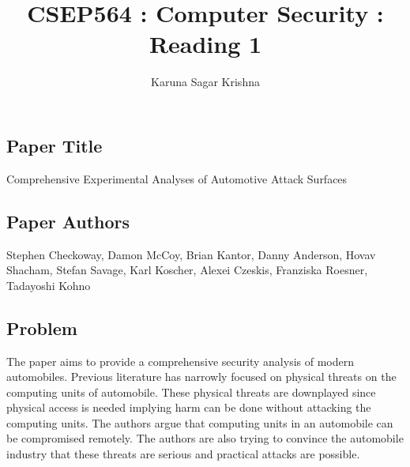 \documentclass[12pt]{article}
\title{CSEP564 : Computer Security : Reading 1}
\author{Karuna Sagar Krishna}
\begin{document}
    \maketitle

    \subsection*{Paper Title}
    Comprehensive Experimental Analyses of Automotive Attack Surfaces

    \subsection*{Paper Authors}
    Stephen Checkoway, Damon McCoy, Brian Kantor, Danny Anderson, Hovav Shacham, Stefan Savage, Karl Koscher, Alexei Czeskis, Franziska Roesner, Tadayoshi Kohno

    \subsection*{Problem}
    The paper aims to provide a comprehensive security analysis of modern automobiles. Previous literature has narrowly focused on physical threats on the computing units of automobile. These physical threats are downplayed since physical access is needed implying harm can be done without attacking the computing units. The authors argue that computing units in an automobile can be compromised remotely. The authors are also trying to convince the automobile industry that these threats are serious and practical attacks are possible.
\end{document}

